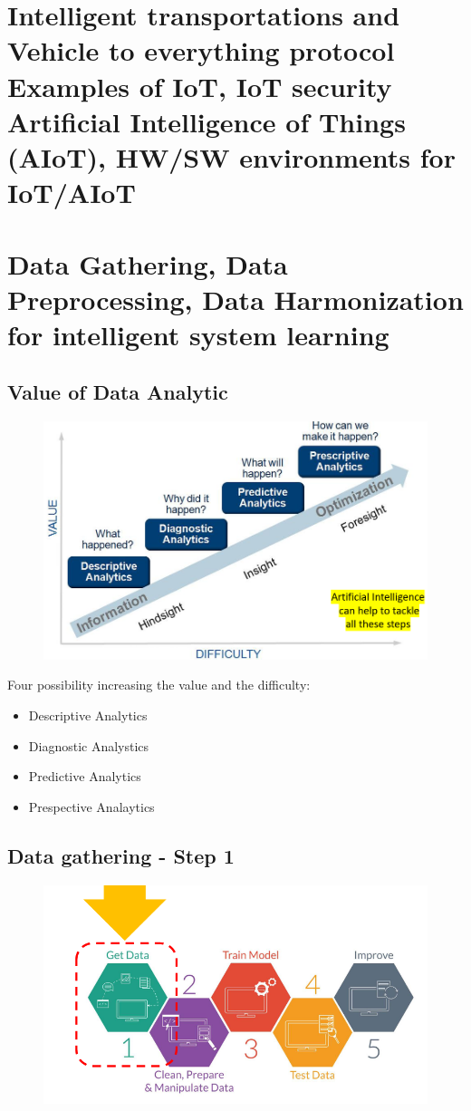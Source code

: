 
\chapter{Intelligent transportations and Vehicle to everything protocol Examples of IoT, IoT security Artificial Intelligence of Things (AIoT), HW/SW environments for IoT/AIoT}


\chapter{Data Gathering, Data Preprocessing, Data Harmonization for intelligent system learning}

\section{Value of Data Analytic}
\begin{figure}[H]
    \centering
    \includegraphics[width=0.8\linewidth]{07-08/images/Data.png}
\end{figure}

Four possibility increasing the value and the difficulty:
\begin{itemize}
    \item Descriptive Analytics
    \item Diagnostic Analystics
    \item Predictive Analytics
    \item Prespective Analaytics
\end{itemize}

\section{Data gathering - Step 1}
\begin{figure}[H]
    \centering
    \includegraphics[width=0.8\linewidth]{07-08/images/data ghatering.png}
\end{figure}

